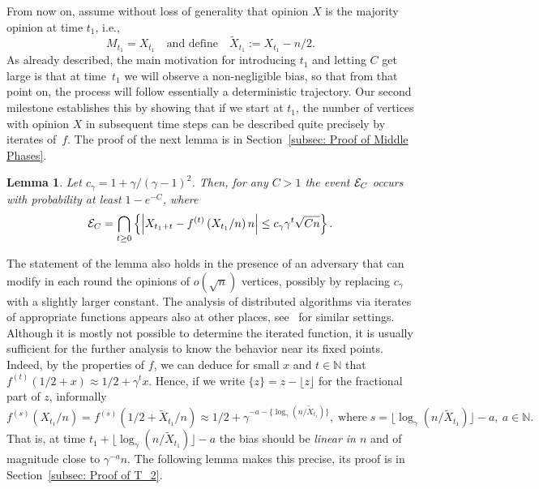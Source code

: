 \documentclass[11pt]{article}
\numberwithin{theorem}{section}
\newtheorem{lemma}[theorem]{Lemma}
\begin{document}
From now on, assume without loss of generality that opinion $X$ is the majority opinion at time $t_1$, i.e.,
\begin{equation*}
M_{t_1} = X_{t_1}\quad \text{and define}\quad \tilde X_{t_1} := X_{t_1}-n/2.
\end{equation*}
As already described, the main motivation for introducing $t_1$ and letting $C$ get large is that at time~$t_1$ we will observe a non-negligible bias, so that from that point on, the process will follow essentially a deterministic trajectory. Our second milestone establishes this by showing that if we start at $t_1$, the number of vertices with opinion $X$ in subsequent time steps can be described quite precisely by iterates of~$f$. 
The proof of the next lemma is in Section~\ref{subsec: Proof of Middle Phases}.
\begin{lemma}\label{lem: MiddlePhases}
    Let $c_\gamma= 1 + \gamma/(\gamma-1)^2$. Then, for any $C> 1$ the event ${\cal E}_C$ occurs with probability at least $1-e^{-C}$, where
    \[
        {\cal E}_C = 
        \bigcap_{t\geq 0} \left \{ \left| X_{t_1+t} - f^{(t)}\left(X_{t_1}/n\right)n\right | \leq c_\gamma \gamma^t \sqrt{Cn} \right \}.
    \]
\end{lemma}
The statement of the lemma also holds in the presence of an adversary that can modify in each round the opinions of $o(\sqrt{n})$ vertices, possibly by replacing $c_\gamma$ with a slightly larger constant. 
The analysis of distributed algorithms via iterates of appropriate functions appears also at other places, see~\cite{Push,Pull} for similar settings. Although it is mostly not possible to determine the iterated function, it is usually sufficient for the further analysis to know the behavior near its fixed points.
Indeed, by the properties of $f$, we can deduce for small $x$ and $t \in \mathbb{N}$ that $f^{(t)}(1/2+x)\approx 1/2+\gamma^tx$. Hence, if we write $\{z\} = z - \lfloor z \rfloor$ for the fractional part of $z$, informally
\[
f^{(s)}(X_{t_1}/n)
=
f^{(s)}(1/2 + \tilde X_{t_1}/n)
\approx 1/2 +\gamma^{-a-\{\log_\gamma(n/\tilde X_{t_1})\}},
\;
\text{where}
\;
s=\lfloor\log_\gamma(n/\tilde X_{t_1})\rfloor-a,
~a \in \mathbb{N}.
\]
That is, at time $t_1 + \lfloor\log_\gamma(n/\tilde X_{t_1})\rfloor-a$ the bias should be \emph{linear in $n$} and of magnitude close to $\gamma^{-a}n$. The following lemma makes this precise, its proof is in Section~\ref{subsec: Proof of T_2}.
\end{document}

